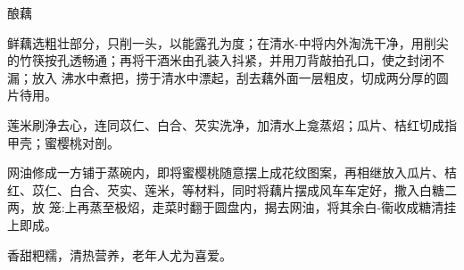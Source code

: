 \begin{recipe}[八宝酿藕]{酿藕}

\ingredients


\cooking

\step 鲜藕选粗壮部分，只削一头，以能露孔为度；在清水-中将内外淘洗干净，用削尖
的竹筷按孔透畅通；再将干酒米由孔装入抖紧，并用刀背敲拍孔口，使之封闭不漏；放入
沸水中煮把，捞于清水中漂起，刮去藕外面一层粗皮，切成两分厚的圆片待用。

\step 莲米刷浄去心，连同苡仁、白合、芡实洗净，加清水上龛蒸炤；瓜片、桔红切成指
甲壳；蜜樱桃对剖。

\step 网油修成一方铺于蒸碗内，即将蜜樱桃随意摆上成花纹图案，再相继放入瓜片、桔
红、苡仁、白合、芡实、莲米，等材料，同时将藕片摆成风车车定好，撒入白糖二两，放
笼:上再蒸至极炤，走菜时翻于圆盘内，揭去网油，将其余白-衞收成糖清挂上即成。

\notes

香甜粑糯，清热营养，老年人尤为喜爱。

\end{recipe}


